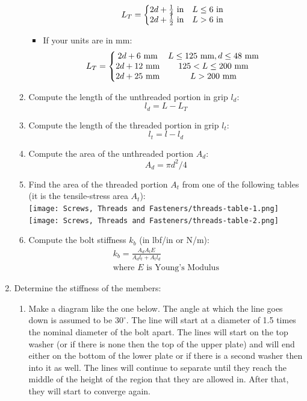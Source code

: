 \documentclass[11pt, fleqn]{article}
\begin{document}
\begin{enumerate}
\begin{enumerate}
\begin{itemize}
\begin{align*}
                L_T=\left\{\begin{matrix} 2d+\frac{1}{4}\text{ in} & L \leq 6\text{ in}\\ 2d+\frac{1}{2}\text{ in} & L>6\text{ in} \end{matrix}\right.
            \end{align*}
            \item If your units are in mm:
            \begin{align*}
                L_T=\left\{\begin{matrix} 2d+6\text{ mm} & L \leq 125\text{ mm}, d \leq 48\text{ mm}\\ 2d+12\text{ mm} & 125 < L \leq 200\text{ mm}\\ 2d + 25\text{ mm} & L > 200 \text{ mm} \end{matrix}\right.
            \end{align*}
        \end{itemize}
        \item Compute the length of the unthreaded portion in grip $l_d$:
        $$l_d=L-L_T$$
        \item Compute the length of the threaded portion in grip $l_t$:
        $$l_t=l-l_d$$
        \item Compute the area of the unthreaded portion $A_d$:
        $$A_d = \pi d^2/4$$
        \item Find the area of the threaded portion $A_t$ from one of the following tables (it is the tensile-stress area $A_t$):\\
        \texttt{[image: Screws, Threads and Fasteners/threads-table-1.png]}\\
        \texttt{[image: Screws, Threads and Fasteners/threads-table-2.png]}
        \item Compute the bolt stiffness $k_b$ (in lbf/in or N/m):
        \begin{align*}
            k_b = \frac{A_d A_t E}{A_dl_t + A_tl_d}\\
            \text{where $E$ is Young's Modulus}
        \end{align*}
    \end{enumerate}
    \item Determine the stiffness of the members:
    \begin{enumerate}
        \item Make a diagram like the one below. The angle at which the line goes down is assumed to be $30^\circ$. The line will start at a diameter of 1.5 times the nominal diameter of the bolt apart. The lines will start on the top washer (or if there is none then the top of the upper plate) and will end either on the bottom of the lower plate or if there is a second washer then into it as well. The lines will continue to separate until they reach the middle of the height of the region that they are allowed in. After that, they will start to converge again. \\

\end{enumerate}
\end{enumerate}
\end{document}

